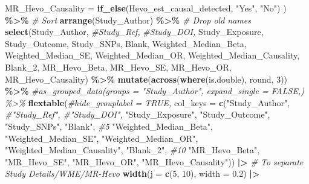 \documentclass[
]{article}
\newenvironment{Shaded}{\begin{snugshade}}{\end{snugshade}}
\newcommand{\AttributeTok}[1]{\textcolor[rgb]{0.13,0.29,0.53}{#1}}
\newcommand{\CommentTok}[1]{\textcolor[rgb]{0.56,0.35,0.01}{\textit{#1}}}
\newcommand{\DecValTok}[1]{\textcolor[rgb]{0.00,0.00,0.81}{#1}}
\newcommand{\FloatTok}[1]{\textcolor[rgb]{0.00,0.00,0.81}{#1}}
\newcommand{\FunctionTok}[1]{\textcolor[rgb]{0.13,0.29,0.53}{\textbf{#1}}}
\newcommand{\NormalTok}[1]{#1}
\newcommand{\SpecialCharTok}[1]{\textcolor[rgb]{0.81,0.36,0.00}{\textbf{#1}}}
\newcommand{\StringTok}[1]{\textcolor[rgb]{0.31,0.60,0.02}{#1}}
\begin{document}
\begin{landscape}
\begin{Shaded}
\begin{Highlighting}[]
         \AttributeTok{MR\_Hevo\_Causality =} \FunctionTok{if\_else}\NormalTok{(Hevo\_est\_causal\_detected, }\StringTok{"Yes"}\NormalTok{, }\StringTok{"No"}\NormalTok{)}
\NormalTok{         ) }\SpecialCharTok{\%\textgreater{}\%} 
  \CommentTok{\# Sort}
  \FunctionTok{arrange}\NormalTok{(Study\_Author) }\SpecialCharTok{\%\textgreater{}\%} 
  \CommentTok{\# Drop old names}
  \FunctionTok{select}\NormalTok{(Study\_Author,}
         \CommentTok{\#Study\_Ref,}
         \CommentTok{\#Study\_DOI,}
\NormalTok{         Study\_Exposure,}
\NormalTok{         Study\_Outcome,}
\NormalTok{         Study\_SNPs, }
\NormalTok{         Blank,}
\NormalTok{         Weighted\_Median\_Beta,}
\NormalTok{         Weighted\_Median\_SE,}
\NormalTok{         Weighted\_Median\_OR,}
\NormalTok{         Weighted\_Median\_Causality,}
\NormalTok{         Blank\_2,}
\NormalTok{         MR\_Hevo\_Beta,}
\NormalTok{         MR\_Hevo\_SE,}
\NormalTok{         MR\_Hevo\_OR,}
\NormalTok{         MR\_Hevo\_Causality) }\SpecialCharTok{\%\textgreater{}\%} 
    \FunctionTok{mutate}\NormalTok{(}\FunctionTok{across}\NormalTok{(}\FunctionTok{where}\NormalTok{(is.double), round, }\DecValTok{3}\NormalTok{)) }\SpecialCharTok{\%\textgreater{}\%} 
  \CommentTok{\#as\_grouped\_data(groups = "Study\_Author", expand\_single = FALSE,) \%\textgreater{}\%}
  \FunctionTok{flextable}\NormalTok{(}\CommentTok{\#hide\_grouplabel = TRUE, }
    \AttributeTok{col\_keys =} \FunctionTok{c}\NormalTok{(}\StringTok{"Study\_Author"}\NormalTok{, }\CommentTok{\#"Study\_Ref", \#"Study\_DOI",}
                 \StringTok{"Study\_Exposure"}\NormalTok{,}
                 \StringTok{"Study\_Outcome"}\NormalTok{,}
                 \StringTok{"Study\_SNPs"}\NormalTok{, }
                 \StringTok{"Blank"}\NormalTok{, }\CommentTok{\#5}
                 \StringTok{"Weighted\_Median\_Beta"}\NormalTok{, }
                 \StringTok{"Weighted\_Median\_SE"}\NormalTok{,}
                 \StringTok{"Weighted\_Median\_OR"}\NormalTok{,}
                 \StringTok{"Weighted\_Median\_Causality"}\NormalTok{,}
                 \StringTok{"Blank\_2"}\NormalTok{, }\CommentTok{\#10}
                 \StringTok{"MR\_Hevo\_Beta"}\NormalTok{, }
                 \StringTok{"MR\_Hevo\_SE"}\NormalTok{,}
                 \StringTok{"MR\_Hevo\_OR"}\NormalTok{,}
                 \StringTok{"MR\_Hevo\_Causality"}\NormalTok{)) }\SpecialCharTok{|\textgreater{}}
  \CommentTok{\# To separate Study Details/WME/MR{-}Hevo}
  \FunctionTok{width}\NormalTok{(}\AttributeTok{j =} \FunctionTok{c}\NormalTok{(}\DecValTok{5}\NormalTok{, }\DecValTok{10}\NormalTok{), }\AttributeTok{width =} \FloatTok{0.2}\NormalTok{) }\SpecialCharTok{|\textgreater{}}

\end{Highlighting}
\end{Shaded}
\end{landscape}
\end{document}
